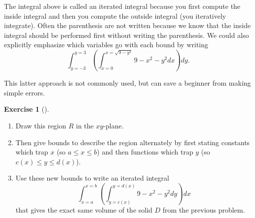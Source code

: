 \documentclass[10pt,]{book}
\theoremstyle{plain}
\theoremstyle{definition}
\theoremstyle{definition}
\theoremstyle{definition}
\theoremstyle{definition}
\newtheorem{exploration}[project]{Exercise}
\theoremstyle{definition}
\numberwithin{equation}{section}
\newcommand{\ds}{\displaystyle}
\begin{document}
The integral above is called an iterated integral because you first compute the inside integral and then you compute the outside integral (you iteratively integrate). Often the parenthesis are not written because we know that the inside integral should be performed first without writing the parenthesis. We could also explicitly emphasize which variables go with each bound by writing%
\begin{equation*}
\ds\int_{y=-3}^{y=3} \left(\int_{x=0}^{x=\sqrt{9-y^2}}9-x^2-y^2 dx\right) dy.
\end{equation*}
%
\par
This latter approach is not commonly used, but can save a beginner from making simple errors.%
\begin{exploration}[]\label{exploration-249}
\leavevmode%
\begin{enumerate}[font=\bfseries,label=(\alph*),ref=\alph*]
\item\label{task-668} Draw this region \(R\) in the \(xy\)-plane.%
\item\label{task-669} Then give bounds to describe the region alternately by first stating constants which trap \(x\) (so \(a\leq x\leq b\)) and then functions which trap \(y\) (so \(c(x)\leq y \leq d(x)\)).%
\item\label{task-670} Use these new bounds to write an iterated integral%
\begin{equation*}
\ds\int_{x=a}^{x=b} \left(\int_{y=c(x)}^{y=d(x)}9-x^2-y^2 dy\right) dx
\end{equation*}
that gives the exact same volume of the solid \(D\) from the previous problem.%
\end{enumerate}
\end{exploration}
\end{document}
